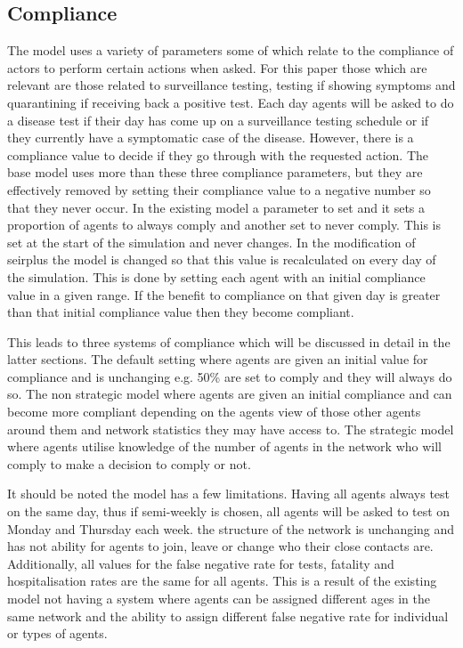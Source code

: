 \documentclass{article}
\begin{document}
\newpage


\subsection{Compliance}
The model uses a variety of parameters some of which relate to the compliance of actors to perform certain actions when asked. For this paper those which are relevant are those related to surveillance testing, testing if showing symptoms and quarantining if receiving back a positive test. Each day agents will be asked to do a disease test if their day has come up on a surveillance testing schedule or if they currently have a symptomatic case of the disease. However, there is a compliance value to decide if they go through with the requested action. The base model uses more than these three compliance parameters, but they are effectively removed by setting their compliance value to a negative number so that they never occur. In the existing model a parameter to set and it sets a proportion of agents to always comply and another set to never comply. This is set at the start of the simulation and never changes. In the modification of seirplus the model is changed so that this value is recalculated on every day of the simulation. This is done by setting each agent with an initial compliance value in a given range. If the benefit to compliance on that given day is greater than that initial compliance value then they become compliant. \newline

This leads to three systems of compliance which will be discussed in detail in the latter sections. The default setting where agents are given an initial value for compliance and is unchanging e.g. 50\% are set to comply and they will always do so. The non strategic model where agents are given an initial compliance and can become more compliant depending on the agents view of those other agents around them and network statistics they may have access to. The strategic model where agents utilise knowledge of the number of agents in the network who will comply to make a decision to comply or not.\newline

It should be noted the model has a few limitations. Having all agents always test on the same day, thus if semi-weekly is chosen, all agents will be asked to test on Monday and Thursday each week. the structure of the network is unchanging and has not ability for agents to join, leave or change who their close contacts are. Additionally, all values for the false negative rate for tests, fatality and hospitalisation rates are the same for all agents. This is a result of the existing model not having a system where agents can be assigned different ages in the same network and the ability to assign different false negative rate for individual or types of agents.
\end{document}
